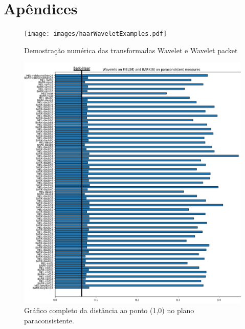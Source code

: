 \chapter{Apêndices}
	\begin{myenv}{1.5}
		\begin{landscape}
				\begin{figure}
					\texttt{[image: images/haarWaveletExamples.pdf]}
					\caption{Demostração numérica das transformadas Wavelet e Wavelet packet}
					\label{fig:haarWaveletExamples}
				\end{figure}
		\end{landscape}
		
		\begin{figure}
			\centering
			\includegraphics[width=0.99\linewidth]{images/results/paraconsistentPlane/ParaconsistentFull}
			\caption{Gráfico completo da distância ao ponto (1,0) no plano paraconsistente.}
			\label{fig:paraconsistentfull}
		\end{figure}
		
	\end{myenv}
	